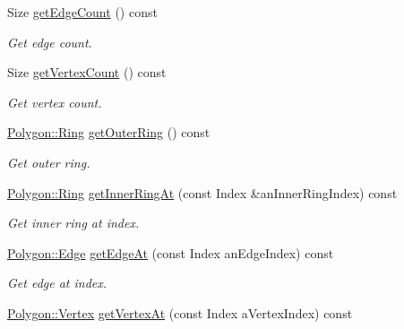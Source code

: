 \begin{DoxyCompactItemize}
Size \hyperlink{classlibrary_1_1math_1_1geom_1_1d2_1_1objects_1_1_polygon_ac01b8f978e663f09ef0f7a91de7720ce}{get\+Edge\+Count} () const
\begin{DoxyCompactList}\small\item\em Get edge count. \end{DoxyCompactList}\item 
Size \hyperlink{classlibrary_1_1math_1_1geom_1_1d2_1_1objects_1_1_polygon_aece2a526c36bbd641588e9742228fb08}{get\+Vertex\+Count} () const
\begin{DoxyCompactList}\small\item\em Get vertex count. \end{DoxyCompactList}\item 
\hyperlink{classlibrary_1_1math_1_1geom_1_1d2_1_1objects_1_1_polygon_aa543e7078b73e1d307ca8317d765cd9c}{Polygon\+::\+Ring} \hyperlink{classlibrary_1_1math_1_1geom_1_1d2_1_1objects_1_1_polygon_a3074bceaa8841e79c843d46377195a0d}{get\+Outer\+Ring} () const
\begin{DoxyCompactList}\small\item\em Get outer ring. \end{DoxyCompactList}\item 
\hyperlink{classlibrary_1_1math_1_1geom_1_1d2_1_1objects_1_1_polygon_aa543e7078b73e1d307ca8317d765cd9c}{Polygon\+::\+Ring} \hyperlink{classlibrary_1_1math_1_1geom_1_1d2_1_1objects_1_1_polygon_ad6014927b89b109098b60861213ea9ed}{get\+Inner\+Ring\+At} (const Index \&an\+Inner\+Ring\+Index) const
\begin{DoxyCompactList}\small\item\em Get inner ring at index. \end{DoxyCompactList}\item 
\hyperlink{classlibrary_1_1math_1_1geom_1_1d2_1_1objects_1_1_polygon_a17e3083d71685e16f3244298e6f44ad9}{Polygon\+::\+Edge} \hyperlink{classlibrary_1_1math_1_1geom_1_1d2_1_1objects_1_1_polygon_a92d93fe3b0f2d2b17b393475f3e1c090}{get\+Edge\+At} (const Index an\+Edge\+Index) const
\begin{DoxyCompactList}\small\item\em Get edge at index. \end{DoxyCompactList}\item 
\hyperlink{classlibrary_1_1math_1_1geom_1_1d2_1_1objects_1_1_polygon_a1559cddbcb23d41f2be9e389b0ccd127}{Polygon\+::\+Vertex} \hyperlink{classlibrary_1_1math_1_1geom_1_1d2_1_1objects_1_1_polygon_a3d592373be3ef2a722cfd70935f47832}{get\+Vertex\+At} (const Index a\+Vertex\+Index) const

\end{DoxyCompactItemize}
